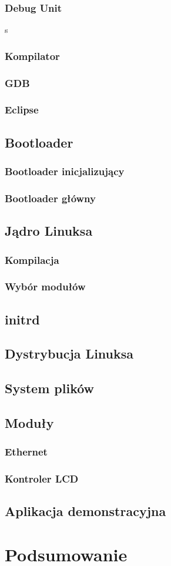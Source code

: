\documentclass[a4paper,12pt]{book}
\begin{document}
				
				
			\subsection{Debug Unit}
				s
			\subsection{Kompilator}
			\subsection{GDB}
			\subsection{Eclipse}
		\section{Bootloader}
			\subsection{Bootloader inicjalizujący}
			\subsection{Bootloader główny}
		\section{Jądro Linuksa}
			\label{sec:linux_kernel}
			\subsection{Kompilacja}
			\subsection{Wybór modułów}
		\section{initrd}
		\section{Dystrybucja Linuksa}
		\section{System plików}
		\section{Moduły}
			\label{sec:linux_modules}
			\subsection{Ethernet}
			\subsection{Kontroler LCD}
		\section{Aplikacja demonstracyjna}
		
	\chapter{Podsumowanie}

	
	
\end{document}
